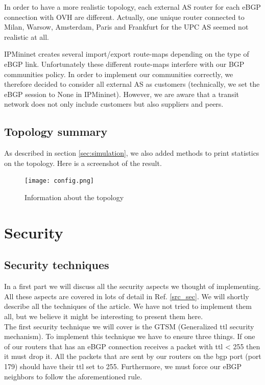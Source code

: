 \documentclass[letter, 9pt, conference]{ieeeconf}
\begin{document}
In order to have a more realistic topology, each external AS router for each eBGP connection with OVH are different. Actually, one unique router connected to Milan, Warsow, Amsterdam, Paris and Frankfurt for the UPC AS seemed not realistic at all. 

IPMininet creates several import/export route-maps depending on the type of eBGP link. Unfortunately these different route-maps interfere with our BGP communities policy. In order to implement our communities correctly, we therefore decided to consider all external AS as customers (technically, we set the eBGP session to None in IPMininet). However, we are aware that a transit network does not only include customers but also suppliers and peers. 

\subsection{Topology summary}
\label{sec:summary}

As described in section \ref{sec:simulation}, we also added methods to print statistics on the topology. Here is a screenshot of the result. 

\begin{figure}[h!]
    \centering
    \texttt{[image: config.png]}
    \caption{Information about the topology}
    \label{fig:topo_summary}
\end{figure}


\section{Security}
\label{sec:security}

\subsection{Security techniques}

In a first part we will discuss all the security aspects we thought of implementing. All these aspects are covered in lots of detail in Ref. \ref{src_sec}. We will shortly describe all the techniques of the article. We have not tried to implement them all, but we believe it might be interesting to present them here. \\

The first security technique we will cover is the GTSM (Generalized ttl security mechanism). To implement this technique we have to ensure three things. 
If one of our routers that has an eBGP connection receives a packet with ttl < 255 then it must drop it.
All the packets that are sent by our routers on the bgp port (port 179) should have their ttl set to 255.
Furthermore, we must force our eBGP neighbors to follow the aforementioned rule.
\end{document}
